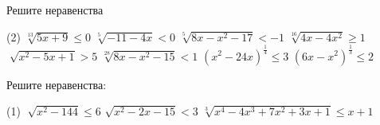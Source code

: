 \begin{class}[number=8]
	\begin{listofex}
		\item Решите неравенства %
		\begin{tasks}(2)
			\task \( \sqrt[13]{5x+9} \le 0 \)
			\task \( \sqrt[5]{-11-4x} < 0 \)
			\task \( \sqrt[5]{8x-x^2-17} < -1 \)
			\task \( \sqrt[16]{4x-4x^2} \ge 1 \)
			\task \( \sqrt[]{x^2-5x+1} > 5 \)
			\task \( \sqrt[28]{8x-x^2-15} < 1 \)
			\task \( (x^2-24x)^{\tfrac{1}{4}} \le 3 \)
			\task \( (6x-x^2)^{\tfrac{1}{3}} \le 2 \)
		\end{tasks}
		\item Решите неравенства: %
		\begin{tasks}(1)
			\task \( \sqrt[]{x^2-144} \le 6 \)
			\task \( \sqrt{x^2-2x-15} < 3 \)
			\task \( \sqrt[3]{x^4-4x^3+7x^2+3x+1} \le x+1 \)
		\end{tasks}
	\end{listofex}
\end{class}


